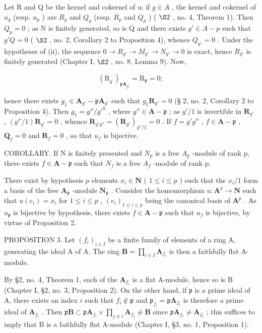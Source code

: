 Let R and Q be the kernel and cokernel of u; if \(g \in A\) , the kernel and cokernel of \(u_g\) (resp. \(u_p\) ) are \(R_g\) and \(Q_g\) (resp. \(R_p\) and \(Q_p\) ) ( \(\S 2\) , no. 4, Theorem 1). Then \(Q_p = 0\) ; as N is finitely generated, so is Q and there exists \(g' \in A - p\) such that \(g'Q = 0\) ( \(\S 2\) , no. 2, Corollary 2 to Proposition 4), whence \(Q_{g'} = 0\) . Under the hypotheses of (ii), the sequence \(0 \to R_{g'} \to M_{g'} \to N_{g'} \to 0\) is exact, hence \(R_{g'}\) is finitely generated (Chapter I, \(\S 2\) , no. 8, Lemma 9). Now,

\[
\left(\mathrm{R} _ {g ^ {\prime}}\right) _ {\mathfrak{p}\mathbf{A}_{g ^ {\prime}}} = \mathrm{R} _ {\mathfrak{p}} = 0;
\]

hence there exists \(g_1 \in \mathbf{A}_{g'} - \mathfrak{p}\mathbf{A}_{g'}\) such that \(g_1\mathbf{R}_{g'} = 0\) (§ 2, no. 2, Corollary 2 to Proposition 4). Then \(g_1 = g'' / g'^h\) , where \(g'' \in \mathbf{A} - \mathfrak{p}\) ; as \(g' / 1\) is invertible in \(\mathbf{R}_{g'}\) , \((g'' / 1)\mathbf{R}_{g'} = 0\) , whence \(\mathbf{R}_{g'g''} = (\mathbf{R}_{g'})_{g'' / 1} = 0\) . If \(f = g'g''\) , \(f \in \mathbf{A} - \mathfrak{p}\) , \(\mathbf{Q}_f = 0\) and \(\mathbf{R}_f = 0\) , so that \(u_f\) is bijective.

COROLLARY. If N is finitely presented and \(N_{p}\) is a free \(A_{p}\) -module of rank p, there exists \(f \in \mathbf{A} - \mathfrak{p}\) such that \(N_{f}\) is a free \(A_{f}\) -module of rank p.

There exist by hypothesis \(p\) elements \(x_{i} \in \mathbf{N}\) ( \(1 \leqslant i \leqslant p\) ) such that the \(x_{i}/1\) form a basis of the free \(\mathbf{A}_{\mathfrak{p}}\) -module \(\mathbf{N}_{\mathfrak{p}}\) . Consider the homomorphism \(u: \mathbf{A}^p \to \mathbf{N}\) such that \(u(e_{i}) = x_{i}\) for \(1 \leqslant i \leqslant p\) , \((e_{i})_{1 \leqslant i \leqslant p}\) being the canonical basis of \(\mathbf{A}^p\) . As \(u_{\mathfrak{p}}\) is bijective by hypothesis, there exists \(f \in \mathbf{A} - \mathfrak{p}\) such that \(u_{f}\) is bijective, by virtue of Proposition 2.

PROPOSITION 3. Let \((f_{i})_{i\in I}\) be a finite family of elements of a ring A, generating the ideal A of A. The ring \(\mathbf{B} = \prod_{i\in I}\mathbf{A}_{f_i}\) is then a faithfully flat A-module.

By §2, no. 4, Theorem 1, each of the \(\mathbf{A}_{f_i}\) is a flat A-module, hence so is B (Chapter I, §2, no. 3, Proposition 2). On the other hand, if \(\mathfrak{p}\) is a prime ideal of A, there exists an index \(i\) such that \(f_i \notin \mathfrak{p}\) and \(\mathfrak{p}_{f_i} = \mathfrak{p} \mathbf{A}_{f_i}\) is therefore a prime ideal of \(\mathbf{A}_{f_i}\) . Then \(\mathfrak{p} \mathbf{B} \subset \mathfrak{p} \mathbf{A}_{f_i} \times \prod_{j \neq i} \mathbf{A}_{f_j} \neq \mathbf{B}\) since \(\mathfrak{p} \mathbf{A}_{f_i} \neq \mathbf{A}_{f_i}\) ; this suffices to imply that B is a faithfully flat A-module (Chapter I, §3, no. 1, Proposition 1).


